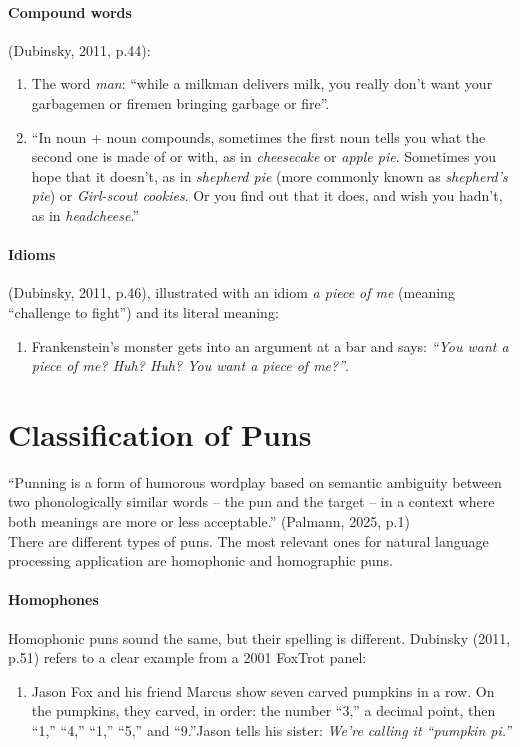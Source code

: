 \documentclass[10pt]{article}
\begin{document}
\paragraph{Compound words} (Dubinsky, 2011, p.44): 

\begin{enumerate}
    \item The word \textit{man}: ``while a milkman delivers milk, you really don't want your garbagemen or firemen bringing garbage or fire''.

    \item ``In noun + noun compounds, sometimes the first noun tells you what the second one is made of or with, as in \textit{cheesecake} or \textit{apple pie}. Sometimes you hope that it doesn't, as in \textit{shepherd pie} (more commonly known as \textit{shepherd's pie}) or \textit{Girl-scout cookies}. Or you find out that it does, and wish you hadn't, as in \textit{headcheese}.'' 
\end{enumerate}


\paragraph{Idioms}  (Dubinsky, 2011, p.46), illustrated with an idiom \textit{a piece of me} (meaning “challenge to fight”) and its literal meaning:


\begin{enumerate}
    \item Frankenstein’s monster gets into an argument at a bar and says: \textit{“You want a piece of me? Huh? Huh? You want a piece of me?”}.
\end{enumerate}

\section{Classification of Puns}
“Punning is a form of humorous wordplay based on semantic ambiguity between two phonologically similar words – the pun and the target – in a context where both meanings are more or less acceptable.” (Palmann, 2025, p.1)\\[6pt]
There are different types of puns. The most relevant ones for natural language processing application are homophonic and homographic puns.

\paragraph{Homophones} Homophonic puns sound the same, but their spelling is different. 
Dubinsky (2011, p.51) refers to a clear example from a 2001 FoxTrot panel:
\begin{enumerate}
    \item Jason Fox and his friend Marcus show seven carved pumpkins in a row.  On the pumpkins, they carved, in order: the number “3,” a decimal point, then “1,” “4,” “1,” “5,” and “9.”Jason tells his sister: \textit{We’re calling it “pumpkin pi.”}
\end{enumerate}
 
\end{document}
